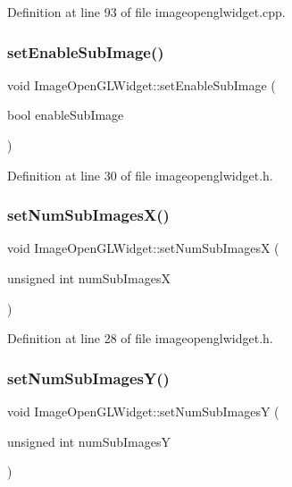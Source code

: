 Definition at line 93 of file imageopenglwidget.\+cpp.

\mbox{\label{class_image_open_g_l_widget_aa31585e01f544f1cdb3354e47a1e32bd}} 
\subsubsection{\texorpdfstring{setEnableSubImage()}{setEnableSubImage()}}
{\footnotesize\ttfamily void Image\+Open\+G\+L\+Widget\+::set\+Enable\+Sub\+Image (\begin{DoxyParamCaption}\item[{bool}]{enable\+Sub\+Image }\end{DoxyParamCaption})\hspace{0.3cm}{\ttfamily [inline]}}



Definition at line 30 of file imageopenglwidget.\+h.

\mbox{\label{class_image_open_g_l_widget_ac8bb2a294c8c164bcbca358ceaf0140a}} 
\subsubsection{\texorpdfstring{setNumSubImagesX()}{setNumSubImagesX()}}
{\footnotesize\ttfamily void Image\+Open\+G\+L\+Widget\+::set\+Num\+Sub\+ImagesX (\begin{DoxyParamCaption}\item[{unsigned int}]{num\+Sub\+ImagesX }\end{DoxyParamCaption})\hspace{0.3cm}{\ttfamily [inline]}}



Definition at line 28 of file imageopenglwidget.\+h.

\mbox{\label{class_image_open_g_l_widget_af7165f96bb82f81eafdadab6621cc2f4}} 
\subsubsection{\texorpdfstring{setNumSubImagesY()}{setNumSubImagesY()}}
{\footnotesize\ttfamily void Image\+Open\+G\+L\+Widget\+::set\+Num\+Sub\+ImagesY (\begin{DoxyParamCaption}\item[{unsigned int}]{num\+Sub\+ImagesY }\end{DoxyParamCaption})\hspace{0.3cm}{\ttfamily [inline]}}



